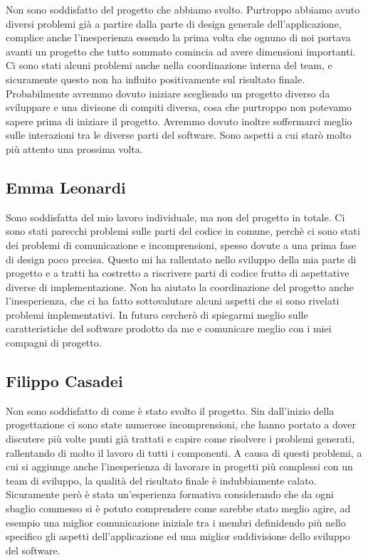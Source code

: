 \documentclass[a4paper,12pt]{report}
\begin{document}
Non sono soddisfatto del progetto che abbiamo svolto. Purtroppo abbiamo avuto diversi problemi già a partire dalla parte di design generale dell'applicazione, complice anche l'inesperienza essendo la prima
volta che ognuno di noi portava avanti un progetto che tutto sommato comincia ad avere dimensioni importanti. Ci sono stati alcuni problemi anche nella coordinazione interna del team, e sicuramente questo
non ha influito positivamente sul risultato finale. Probabilmente avremmo dovuto iniziare scegliendo un progetto diverso da sviluppare e una divisone di compiti diversa, cosa che purtroppo non potevamo sapere
prima di iniziare il progetto. Avremmo dovuto inoltre soffermarci meglio sulle interazioni tra le diverse parti del software. Sono aspetti a cui starò molto più attento una prossima volta.

\subsection{Emma Leonardi}

Sono soddisfatta del mio lavoro individuale, ma non del progetto in totale. Ci sono stati parecchi problemi sulle parti del codice in comune, 
perchè ci sono stati dei problemi di comunicazione e incomprensioni, spesso dovute a una prima fase di design poco precisa. Questo mi ha rallentato nello sviluppo della mia parte di progetto e a tratti ha costretto a riscrivere parti di codice frutto di aspettative diverse di implementazione. 
Non ha aiutato la coordinazione del progetto anche l'inesperienza, che ci ha fatto sottovalutare alcuni aspetti che si sono rivelati problemi implementativi. 
In futuro cercherò di spiegarmi meglio sulle caratteristiche del software prodotto da me e comunicare meglio con i miei compagni di progetto. 

\subsection{Filippo Casadei}
Non sono soddisfatto di come è stato svolto il progetto. Sin dall'inizio della progettazione ci sono state numerose incomprensioni, che hanno portato a dover discutere più volte punti già trattati e capire come risolvere i problemi generati,
rallentando di molto il lavoro di tutti i componenti. A causa di questi problemi, a cui si aggiunge anche l'inesperienza di lavorare in progetti più complessi con un team di sviluppo, la qualità del risultato finale è indubbiamente calato. 
Sicuramente però è stata un'esperienza formativa considerando che da ogni sbaglio commesso si è potuto comprendere come sarebbe stato meglio agire, ad esempio una miglior comunicazione
iniziale tra i membri definidendo più nello specifico gli aspetti dell'applicazione ed una miglior suddivisione dello sviluppo del software. 
\end{document}

